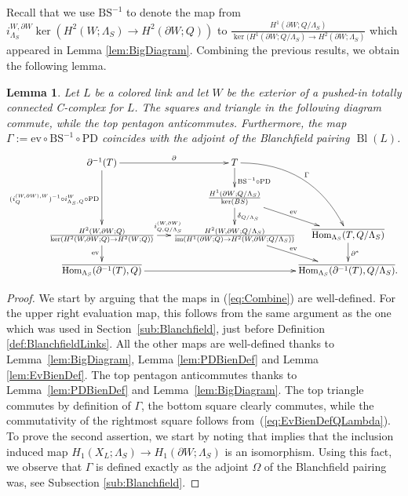 \documentclass[11pt,a4paper]{amsart}
\newtheorem{lemma}[theorem]{Lemma}
\theoremstyle{definition}
\newcommand{\im}{\operatorname{im}}
\DeclareMathOperator{\Hom}{Hom}
\def\op{\operatorname}
\begin{document}
Recall that we use $\text{BS}^{-1}$ to denote the map from $i_{\Lambda_S}^{W,\partial W}\ker(H^2(W;\Lambda_S) \to H^2(\partial W;Q))$ to $\frac{H^1(\partial W;Q/ \Lambda_S)}{\ker(H^1(\partial W;Q/ \Lambda_S) \to H^2(\partial W;\Lambda_S)}$ which appeared in Lemma \ref{lem:BigDiagram}. Combining the previous results, we obtain the following lemma.

\begin{lemma}
\label{lem:Combine}
Let $L$ be a colored link and let $W$ be the exterior of a pushed-in totally connected C-complex for $L$. The squares and triangle in the following diagram commute, while the top pentagon anticommutes. Furthermore, the map $\Gamma:=\text{ev} \circ \text{BS}^{-1} \circ \text{PD}$ coincides with the adjoint of the Blanchfield pairing $\op{Bl}(L)$.
\begin{equation}
\label{eq:Combine}
\xymatrix@R0.6cm@C-1cm{
\partial^{-1}(T) \ar[rrrrrrrrrrrrr]^-\partial \ar[dd]_{(i_Q^{(W,\partial W),W})^{-1} \circ i_{\Lambda_S,Q}^W\circ \text{PD}}  &&&&&&&&&&&&& T  \ar[d]^{\text{BS}^{-1} \circ \text{PD}} 
\ar@/^2pc/[ddrr]^{\Gamma} 
&&\\
&&&&&&&&&&&&& \frac{H^1(\partial W;Q/\Lambda_S)}{\ker(BS)} \ar[d]^{\delta_{Q/\Lambda_S}} \ar[rrd]^{\text{ev}}\\
\frac{H^2(W,\partial W;Q)}{\ker(H^2(W,\partial W;Q) \to H^2(W;Q)) }  \ar[rrrrrrrrrrrrr]^{i_{Q,Q/\Lambda_S}^{(W,\partial W)}} \ar[d]_{\text{ev}}  &&&&&&&&&&&&& \frac{H^2(W,\partial W;Q/\Lambda_S)}{\im(H^1(\partial W;Q) \to H^2(W,\partial W;Q/\Lambda_S))} \ar[rrd]^{\text{ev}}  &&   \overline{ \Hom_{\Lambda_S}(T,Q/\Lambda_S) } \ar[d]^{\partial^*} \\
\overline{ \Hom_{\Lambda_S}(\partial^{-1}(T),Q) }\ar[rrrrrrrrrrrrrrr] &&&&&&&&&&&&&&&  \overline{ \Hom_{\Lambda_S}(\partial^{-1}(T),Q/\Lambda_S) }.
}
\end{equation}
\end{lemma}
\begin{proof}
We start by arguing that the maps in (\ref{eq:Combine}) are well-defined. For the upper right evaluation map, this follows from the same argument as the one which was used in Section~\ref{sub:Blanchfield}, just before Definition \ref{def:BlanchfieldLinks}. All the other maps are well-defined thanks to Lemma~\ref{lem:BigDiagram}, Lemma \ref{lem:PDBienDef} and Lemma \ref{lem:EvBienDef}.  The top pentagon anticommutes thanks to Lemma~\ref{lem:PDBienDef} and Lemma~\ref{lem:BigDiagram}. 
The top triangle commutes by definition of $\Gamma$, the bottom square clearly commutes, while the commutativity of the rightmost square follows from~(\ref{eq:EvBienDefQLambda}). To prove the second assertion, we start by noting that \cite[Lemma 5.2]{ConwayFriedlToffoli} implies that the inclusion induced map $H_1(X_L;\Lambda_S) \to H_1(\partial W;\Lambda_S)$ is an isomorphism. Using this fact, we observe that $\Gamma$ is defined exactly as the adjoint $\Omega$ of the Blanchfield pairing was, see Subsection \ref{sub:Blanchfield}.
\end{proof}
\end{document}
